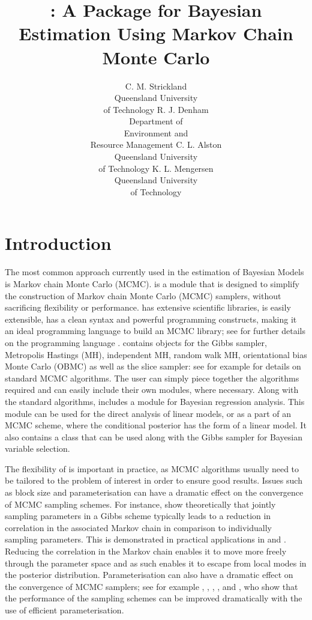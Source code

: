 \documentclass[article]{jss}
\author{C. M. Strickland\\Queensland University\\ of Technology \And 
        R. J. Denham\\Department of \\Environment and\\ Resource Management \And
        C. L. Alston\\Queensland University\\ of Technology \And 
        K. L. Mengersen\\Queensland University\\ of Technology}
\title{\pkg{PyMCMC}: A \proglang{Python} Package for Bayesian Estimation 
  Using Markov Chain Monte Carlo}
\begin{document}
\section{Introduction}

The most common approach currently used in the estimation of Bayesian
Models is Markov chain Monte Carlo (MCMC).  is a
 module that is designed to simplify the construction
of Markov chain Monte Carlo (MCMC) samplers, without sacrificing
flexibility or performance.  has extensive scientific
libraries, is easily extensible, has a clean syntax and powerful
programming constructs, making it an ideal programming language to
build an MCMC library; see \citet{Python} for further details on the
programming language .  contains objects
for the Gibbs sampler, Metropolis Hastings (MH), independent MH,
random walk MH, orientational bias Monte Carlo (OBMC) as well as the
slice sampler: see for example \citet{RobertCassela1999} for details on
standard MCMC algorithms. The user can simply piece together the algorithms
required and can easily include their own modules, where necessary.
Along with the standard algorithms,  includes a module for
Bayesian regression analysis. This module can be used for the direct
analysis of linear models, or as a part of an MCMC scheme, where the
conditional posterior has the form of a linear model.  It also
contains a class that can be used along with the Gibbs sampler for
Bayesian variable selection.

The flexibility of  is important in practice, as MCMC
algorithms usually need to be tailored to the problem of interest in
order to ensure good results.  Issues such as block size and
parameterisation can have a dramatic effect on the convergence of MCMC
sampling schemes. For instance, \citet{LuiKongWong1994} show
theoretically that jointly sampling parameters in a Gibbs scheme
typically leads to a reduction in correlation in the associated Markov
chain in comparison to individually sampling parameters. This is
demonstrated in practical applications in \citet{CarterKohn1994} and
\citet{KimShephardChib1998}. Reducing the correlation in the Markov
chain enables it to move more freely through the parameter space and
as such enables it to escape from local modes in the posterior
distribution. Parameterisation can also have a dramatic effect on the
convergence of MCMC samplers; see for example
\citet{GelfandSahuCarlin1995}, \citet{RobersSahu1997},
\citet{PittShepard1999}, \citet{RobertMengersen1999},
\citet{FruwirthSchnatter2004} and \citet{StricklandMartinForbes2008},
who show that the performance of the sampling schemes can be improved
dramatically with the use of efficient parameterisation.
\end{document}
